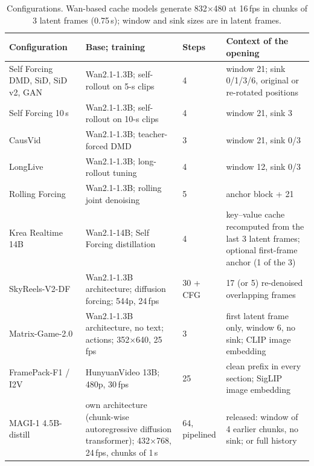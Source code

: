 \begin{table}[h]
\centering\scriptsize
\caption{Configurations. Wan-based cache models generate 832$\times$480 at 16\,fps in chunks of 3 latent frames
(0.75\,s); window and sink sizes are in latent frames.}
\label{tab:models}
\begin{tabular}{@{}p{3.6cm}p{4.6cm}p{1.2cm}p{4.4cm}@{}}
\toprule
Configuration & Base; training & Steps & Context of the opening \\
\midrule
Self Forcing DMD, SiD, SiD v2, GAN~\cite{selfforcing,dmd,sid} & Wan2.1-1.3B; self-rollout on 5-s clips & 4 & window 21; sink 0/1/3/6, original or re-rotated positions \\
Self Forcing 10\,s & Wan2.1-1.3B; self-rollout on 10-s clips & 4 & window 21, sink 3 \\
CausVid~\cite{causvid} & Wan2.1-1.3B; teacher-forced DMD & 3 & window 21, sink 0/3 \\
LongLive~\cite{longlive} & Wan2.1-1.3B; long-rollout tuning & 4 & window 12, sink 0/3 \\
Rolling Forcing~\cite{rollingforcing} & Wan2.1-1.3B; rolling joint denoising & 5 & anchor block + 21 \\
Krea Realtime 14B~\cite{krea} & Wan2.1-14B; Self Forcing distillation & 4 & key--value cache recomputed from the last 3 latent frames; optional first-frame anchor (1 of the 3) \\
SkyReels-V2-DF~\cite{skyreels} & Wan2.1-1.3B architecture; diffusion forcing; 544p, 24\,fps & 30 + CFG & 17 (or 5) re-denoised overlapping frames \\
Matrix-Game-2.0~\cite{matrixgame2} & Wan2.1-1.3B architecture, no text; actions; 352$\times$640, 25\,fps & 3 & first latent frame only, window 6, no sink; CLIP image embedding \\
FramePack-F1 / I2V~\cite{framepack} & HunyuanVideo 13B; 480p, 30\,fps & 25 & clean prefix in every section; SigLIP image embedding \\
MAGI-1 4.5B-distill~\cite{magi} & own architecture (chunk-wise autoregressive diffusion transformer); 432$\times$768, 24\,fps, chunks of 1\,s & 64, pipelined & released: window of 4 earlier chunks, no sink; or full history \\
\bottomrule
\end{tabular}
\end{table}
